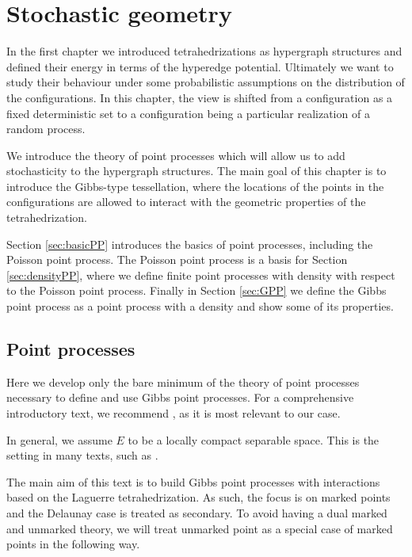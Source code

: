 \chapter{Stochastic geometry}\label{ch:2}

In the first chapter we introduced tetrahedrizations as hypergraph structures and defined their energy in terms of the hyperedge potential. 
Ultimately we want to study their behaviour under some probabilistic assumptions on the distribution of the configurations. In this chapter, the view is shifted from a configuration as a fixed deterministic set to a configuration being a particular realization of a random process.

We introduce the theory of point processes which will allow us to add stochasticity to the hypergraph structures. The main goal of this chapter is to introduce the Gibbs-type tessellation, where the locations of the points in the configurations are allowed to interact with the geometric properties of the tetrahedrization.

Section \ref{sec:basicPP} introduces the basics of point processes, including the Poisson point process. The Poisson point process is a basis for Section \ref{sec:densityPP}, where we define finite point processes with density with respect to the Poisson point process. Finally in Section \ref{sec:GPP} we define the Gibbs point process as a point process with a density and show some of its properties.

\section{Point processes}
Here we develop only the bare minimum of the theory of point processes necessary to define and use Gibbs point processes. For a comprehensive introductory text, we recommend \cite{MollerWaagepetersen2003}, as it is most relevant to our case. \newline

\noindent In general, we assume $E$ to be a locally compact separable space. This is the setting in many texts, such as \cite{SchneiderWeil2008}.

The main aim of this text is to build Gibbs point processes with interactions based on the Laguerre tetrahedrization. As such, the focus is on marked points and the Delaunay case is treated as secondary. To avoid having a dual marked and unmarked theory, we will treat unmarked point as a special case of marked points in the following way. 

